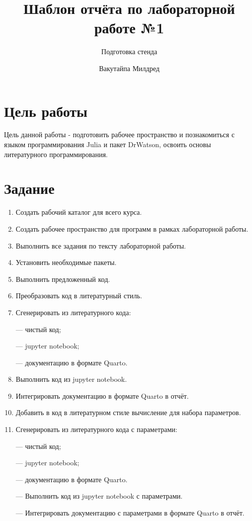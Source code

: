 \documentclass[
  english,
  russian,
  12pt,
  a4paper,
  DIV=11,
  numbers=noendperiod]{scrreprt}
\title{Шаблон отчёта по лабораторной работе №1}
\subtitle{Подготовка стенда}
\author{Вакутайпа Милдред}
\date{}
\renewcommand*\contentsname{Содержание}
\newcommand\contentsname{Содержание}
\begin{document}
\maketitle

\renewcommand*\contentsname{Содержание}
{
\setcounter{tocdepth}{1}
\tableofcontents
}
\listoffigures
\listoftables

\chapter{Цель
работы}\label{ux446ux435ux43bux44c-ux440ux430ux431ux43eux442ux44b}

Цель данной работы - подготовить рабочее пространство и познакомиться с
языком программирования Julia и пакет DrWatson, освоить основы
литературного программирования.

\chapter{Задание}\label{ux437ux430ux434ux430ux43dux438ux435}

\begin{enumerate}
\def\labelenumi{\arabic{enumi}.}
\item
  Создать рабочий каталог для всего курса.
\item
  Создать рабочее пространство для программ в рамках лабораторной
  работы.
\item
  Выполнить все задания по тексту лабораторной работы.
\item
  Установить необходимые пакеты.
\item
  Выполнить предложенный код.
\item
  Преобразовать код в литературный стиль.
\item
  Сгенерировать из литературного кода:

  --- чистый код;

  --- jupyter notebook;

  --- документацию в формате Quarto.
\item
  Выполнить код из jupyter notebook.
\item
  Интегрировать документацию в формате Quarto в отчёт.
\item
  Добавить в код в литературном стиле вычисление для набора параметров.
\item
  Сгенерировать из литературного кода с параметрами:

  --- чистый код;

  --- jupyter notebook;

  --- документацию в формате Quarto.

  --- Выполнить код из jupyter notebook с параметрами.

  --- Интегрировать документацию с параметрами в формате Quarto в отчёт.
\end{enumerate}
\end{document}
